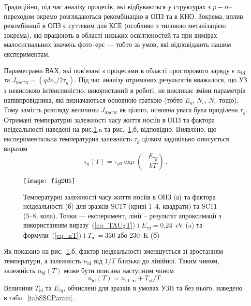 Традиційно, під час аналізу процесів, які відбуваються у структурах з $p-n$--переходом окремо розглядаються рекомбінацію в ОПЗ та в КНО.
Зокрема, вплив рекомбінації в ОПЗ є суттєвим для КСЕ (особливо з тиловою металізацією зокрема), які працюють в області низьких
освітленостей та при вимірах малосигнальних значень фото--ерс \cite{Sach:UPJ2016} --- тобто за умов, які відповідають нашим експериментам.


Параметрами ВАХ, які пов'язані з процесами в області просторового заряду є $n_{\mathrm{id}}$ та $J_{0SCR}=(qdn_i/2\tau_{g})$.
Під час аналізу отриманих результатів вважалося, що УЗ з невисокою інтенсивністю, використаний в роботі, не
викликає зміни параметрів напівпровідника, які визначаються основною ґраткою (тобто  $E_g$, $N_c$, $N_v$ тощо).
Тому замість розгляду величини $J_{0SCR}$ як цілого, основна увага була приділена $\tau_{g}$.
Отримані температурні залежності часу життя носіїв в ОПЗ та фактора неідеальності наведені на рис.\ref{figDUS},a та рис.~\ref{figDUS},б, відповідно.
Виявлено, що експериментальна температурна залежність $\tau_{g}$ цілком задовільно описується виразом
\begin{equation}
\label{eq_TAUgT}
    \tau_{g}(T)=\tau_{g0}\exp\left(-\frac{E_{\tau g}}{kT}\right)\:.
\end{equation}

\begin{figure}
\center
\texttt{[image: figDUS]}%
\caption{\label{figDUS}
Температурні залежності часу життя носіїв в ОПЗ (а) та фактора неідеальності (б)
для зразків SC17 (криві 1--4, квадрати) та SC11 (5--8, кола).
\FigCaptionSSC
Точки --- експеримент,
лінії -- результат апроксимації з використанням виразу~(\ref{eq_TAUgT}) і $E_{\tau g}=0.24$~eV (a) та
формули~(\ref{eq_nT}) і $T_\mathrm{id}=330$ або 230~K (б)
}%
\end{figure}

Як показано на рис.~\ref{figDUS},б, фактор неідеальності зменшується зі зростанням температури, а залежність
$n_{\mathrm{id}}$ від $1/T$  близька до лінійної.
Таким чином, залежність $n_{\mathrm{id}}(T)$ може бути описана наступним чином
\begin{equation}
\label{eq_nT}
    n_{\mathrm{id}}(T)=n_{\mathrm{id},\infty}+T_{\mathrm{id}}/T\:.
\end{equation}
Величини $T_{\mathrm{id}}$ та $E_{\tau g}$, обчислені для зразків в умовах УЗН та без нього, наведено в табл.~\ref{tabSSCParam}.


